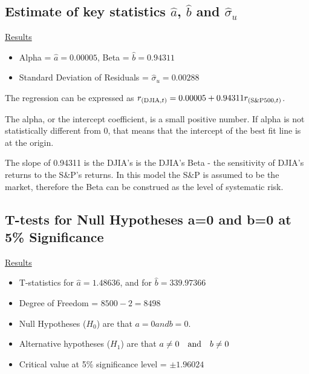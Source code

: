\documentclass[a4paper]{article}
\begin{document}
	\subsection{Estimate of key statistics $\hat{a}$, $\hat{b}$ and $\hat{\sigma}_{u}$}
	\underline{Results}
	\begin{itemize}[nosep]
		\item Alpha = $\hat{a} = 0.00005$, Beta = $\hat{b} = 0.94311$
		\item Standard Deviation of Residuals = $\hat{\sigma}_{u} = 0.00288$
	\end{itemize}

	The regression can be expressed as $r_{(\textnormal{DJIA}, t)} = 0.00005 +  0.94311 r_{(\textnormal{S\&P500}, t)}$.
	
	The alpha, or the intercept coefficient, is a small positive number. If alpha is not statistically different from 0, that means that the intercept of the best fit line is at the origin.
	
	The slope of 0.94311 is the DJIA's is the DJIA's Beta - the sensitivity of DJIA’s returns to the S\&P’s returns. In this model the S\&P is assumed to be the market, therefore the Beta can be construed as the level of systematic risk.
	
	\subsection{T-tests for Null Hypotheses a=0 and b=0 at 5\% Significance}
	\underline{Results}
	\begin{itemize}[nosep]
		\item T-statistics for $\hat{a} = 1.48636$, and for $\hat{b} = 339.97366$
		\item Degree of Freedom = $8500 - 2 = 8498$
		\item Null Hypotheses ($H_0$) are that $a=0 and b=0$.
		\item Alternative hypotheses ($H_1$) are that $a\ne 0 \quad \textnormal{and} \quad b\ne 0$
		\item Critical value at 5\% significance level = $\pm1.96024$
	\end{itemize}
	

	
\end{document}
